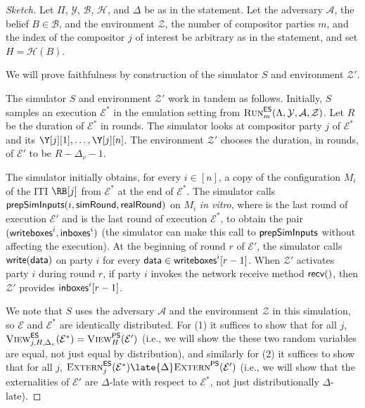 \begin{proof}[Sketch]
  Let $\Pi$, $\mathcal{Y}$, $\mathcal{B}$, $\mathcal{H}$,
  and $\Delta$ be as in the statement.
  Let the adversary $\mathcal{A}$, the belief $B \in \mathcal{B}$,
  and the environment $\mathcal{Z}$, the number of compositor parties $m$,
  and the index of the compositor $j$ of interest be arbitrary
  as in the statement, and set $H = \mathcal{H}(B)$.

  We will prove faithfulness by
  construction of the simulator $S$ and environment $\mathcal{Z}'$.

  The simulator $S$ and environment $\mathcal{Z}'$ work in tandem
  as follows.
  Initially, $S$ samples an execution
  $\mathcal{E}^*$ in the emulation setting from
  $\textsc{Run}^{\textsf{ES}}_m(\Lambda, \mathcal{Y}, \mathcal{A}, \mathcal{Z})$.
  Let $R$ be the duration of $\mathcal{E}^*$ in rounds.
  The simulator looks at compositor party $j$ of $\mathcal{E}^*$
  and its $\Y[j][1], \ldots, \Y[j][n]$.
  The environment $\mathcal{Z}'$ chooses the duration, in rounds, of
  $\mathcal{E}'$ to be $R - \Delta_v - 1$.

  The simulator initially obtains, for every $i \in [n]$,
  a copy of the configuration $M_i$ of the ITI $\RB[j]$ from $\mathcal{E}^*$ at the end of
  $\mathcal{E}^*$.
  The simulator calls $\textsf{prepSimInputs}(i, \textsf{simRound}, \textsf{realRound})$ on $M_i$
  \emph{in vitro}, where \simulationRound is the last round of execution $\mathcal{E}'$
  and \realityRound is the last round of execution $\mathcal{E}^*$, to obtain the pair
  $(\textsf{writeboxes}^i, \textsf{inboxes}^i)$
  (the simulator can make this call to $\textsf{prepSimInputs}$ without affecting the execution).
  At the beginning of round $r$ of $\mathcal{E}'$, the simulator calls
  $\textsf{write}(\textsf{data})$ on party $i$
  for every $\textsf{data} \in \textsf{writeboxes}^i[r - 1]$.
  When $\mathcal{Z}'$ activates party $i$ during round $r$,
  if party $i$ invokes the network receive method $\textsf{recv}()$, then $\mathcal{Z}'$
  provides $\textsf{inboxes}^i[r - 1]$.

  We note that $S$ uses the adversary $\mathcal{A}$ and the
  environment $\mathcal{Z}$ in this simulation, so $\mathcal{E}$
  and $\mathcal{E}^*$ are identically distributed.
  For (1) it suffices to show that for all $j$,
  $\textsc{View}^{\textsf{ES}}_{j,H,\Delta_v}(\mathcal{E}^*) = \textsc{View}^{\textsf{PS}}_H(\mathcal{E}')$
  (i.e., we will show the these two random variables are equal,
  not just equal by distribution),
  and similarly for (2) it suffices to show that for all $j$,
  $\LCExtern_j(\mathcal{E}^*) \late{\Delta} \PEExtern(\mathcal{E}')$
  (i.e., we will show that the externalities of $\mathcal{E}'$ are $\Delta$-late
  with respect to $\mathcal{E}^*$, not just distributionally $\Delta$-late).


\end{proof}

